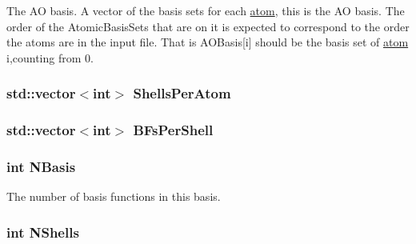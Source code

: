 The AO basis. A vector of the basis sets for each \hyperlink{classJKBuilder_1_1atom}{atom}, this is the AO basis. The order of the AtomicBasisSets that are on it is expected to correspond to the order the atoms are in the input file. That is AOBasis\mbox{[}i\mbox{]} should be the basis set of \hyperlink{classJKBuilder_1_1atom}{atom} i,counting from 0. \hypertarget{classJKBuilder_1_1AOBasisSet_a82f86f036166d7d52ed2aea14bfe8510}{
\subsubsection[{ShellsPerAtom}]{\setlength{\rightskip}{0pt plus 5cm}std::vector$<$int$>$ {\bf ShellsPerAtom}}}
\label{classJKBuilder_1_1AOBasisSet_a82f86f036166d7d52ed2aea14bfe8510}
\hypertarget{classJKBuilder_1_1AOBasisSet_a8d80fa437dbb830552ffe2a6b07630fb}{
\subsubsection[{BFsPerShell}]{\setlength{\rightskip}{0pt plus 5cm}std::vector$<$int$>$ {\bf BFsPerShell}}}
\label{classJKBuilder_1_1AOBasisSet_a8d80fa437dbb830552ffe2a6b07630fb}
\hypertarget{classJKBuilder_1_1BasisSet_a41e2bc1e52da2859eabe6586e4451663}{
\subsubsection[{NBasis}]{\setlength{\rightskip}{0pt plus 5cm}int {\bf NBasis}}}
\label{classJKBuilder_1_1BasisSet_a41e2bc1e52da2859eabe6586e4451663}


The number of basis functions in this basis. \hypertarget{classJKBuilder_1_1BasisSet_a9f13901f058284051a35aabd9d69c6d5}{
\subsubsection[{NShells}]{\setlength{\rightskip}{0pt plus 5cm}int {\bf NShells}}}
\label{classJKBuilder_1_1BasisSet_a9f13901f058284051a35aabd9d69c6d5}


